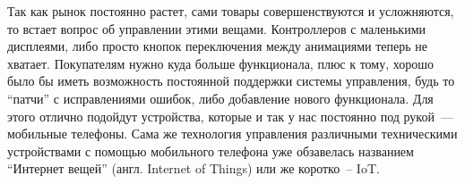 Так как рынок постоянно растет, сами товары совершенствуются и усложняются, то встает вопрос об управлении этими вещами. Контроллеров с маленькими дисплеями, либо просто кнопок переключения между анимациями теперь не хватает. Покупателям нужно куда больше функционала, плюс к тому, хорошо было бы иметь возможность постоянной поддержки системы управления, будь то ``патчи'' с исправлениями ошибок, либо добавление нового функционала. Для этого отлично подойдут устройства, которые и так у нас постоянно под рукой~--- мобильные телефоны. Сама же технология управления различными техническими устройствами с помощью мобильного телефона уже обзавелась названием ``Интернет вещей'' (англ. Internet of Things) или же коротко~-- IoT.
